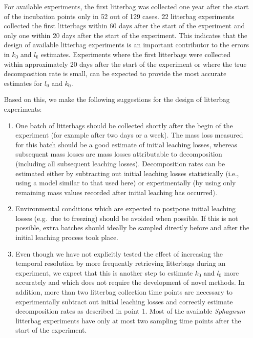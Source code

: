\documentclass[bg, manuscript]{copernicus}
\begin{document}
For available experiments, the first litterbag was collected one year after the start of the incubation points only in 52 out of 129 cases. 22 litterbag experiments collected the first litterbags within 60 days after the start of the experiment and only one within 20 days after the start of the experiment. This indicates that the design of available litterbag experiments is an important contributor to the errors in \(k_0\) and \(l_0\) estimates. Experiments where the first litterbags were collected within approximately 20 days after the start of the experiment or where the true decomposition rate is small, can be expected to provide the most accurate estimates for \(l_0\) and \(k_0\).

Based on this, we make the following suggestions for the design of litterbag experiments:

\begin{enumerate}
\def\labelenumi{\arabic{enumi}.}
\item
  One batch of litterbags should be collected shortly after the begin of the experiment (for example after two days or a week). The mass loss measured for this batch should be a good estimate of initial leaching losses, whereas subsequent mass losses are mass losses attributable to decomposition (including all subsequent leaching losses). Decomposition rates can be estimated either by subtracting out initial leaching losses statistically (i.e., using a model similar to that used here) or experimentally (by using only remaining mass values recorded after initial leaching has occurred).
\item
  Environmental conditions which are expected to postpone initial leaching losses (e.g.~due to freezing) should be avoided when possible. If this is not possible, extra batches should ideally be sampled directly before and after the initial leaching process took place.
\item
  Even though we have not explicitly tested the effect of increasing the temporal resolution by more frequently retrieving litterbags during an experiment, we expect that this is another step to estimate \(k_0\) and \(l_0\) more accurately and which does not require the development of novel methods. In addition, more than two litterbag collection time points are necessary to experimentally subtract out initial leaching losses and correctly estimate decomposition rates as described in point 1. Most of the available \emph{Sphagnum} litterbag experiments have only at most two sampling time points after the start of the experiment.
\end{enumerate}
\end{document}

